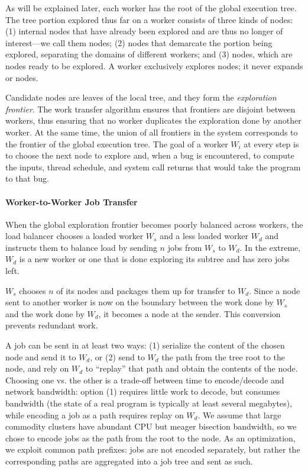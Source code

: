 As will be explained later, each worker has the root of the global execution tree.  The tree portion explored thus far on a worker consists of three kinds of nodes: (1) internal nodes that have already been explored and are thus no longer of interest---we call them {\em \dead} nodes; (2) {\em \fence} nodes that demarcate the portion being explored, separating the domains of different workers; and (3) {\em \candidate} nodes, which are nodes ready to be explored.  A worker exclusively explores \candidate nodes; it never expands \fence or \dead nodes.

Candidate nodes are leaves of the local tree, and they form the \emph{exploration frontier}.  The work transfer algorithm ensures that frontiers are disjoint between workers, thus ensuring that no worker duplicates the exploration done by another worker.  At the same time, the union of all frontiers in the system corresponds to the frontier of the global execution tree. The goal of a worker  $W_i$ at every step is to choose the next \candidate node to explore and, when a bug is encountered, to compute the inputs, thread schedule, and system call returns that would take the program to that bug.

\paragraph{Worker-to-Worker Job Transfer}
\label{sec:workTransfer}

\newcommand{\wsrc}{\ensuremath{W_s}\xspace}
\newcommand{\wdst}{\ensuremath{W_d}\xspace}

When the global exploration frontier becomes poorly balanced across workers, the load balancer chooses a loaded worker \wsrc and a less loaded worker \wdst  and instructs them to balance load by sending $n$ jobs from \wsrc to \wdst.  In the extreme, \wdst is a new worker or one that is done exploring its subtree and has zero jobs left.  

\wsrc chooses $n$ of its \candidate nodes and packages them up for transfer to \wdst.  Since a \candidate node sent to another worker is now on the boundary between the work done by \wsrc and the work done by \wdst, it becomes a \fence node at the sender.  This conversion prevents redundant work.

A job can be sent in at least two ways: (1) serialize the content of the chosen node and send it to \wdst, or (2) send to \wdst the path from the tree root to the node, and rely on \wdst to ``replay'' that path and obtain the contents of the node.  Choosing one vs. the other is a trade-off between time to encode/decode and network bandwidth: option (1) requires little work to decode, but consumes bandwidth (the state of a real program is typically at least several megabytes), while encoding a job as a path requires replay on \wdst.  We assume that large commodity clusters have abundant CPU but meager bisection bandwidth,
so we chose to encode jobs as the path from the root to the \candidate node.  As an optimization, we exploit common path prefixes: jobs are not encoded separately, but rather the corresponding paths are aggregated into a job tree and sent as such.

